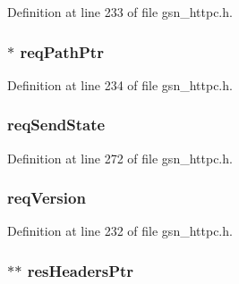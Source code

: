 Definition at line 233 of file gsn\_\-httpc.h.

\hypertarget{a00093_a89c93815bbc36a53553865e3a843157e}{
\subsubsection[{reqPathPtr}]{$\ast$ {\bf reqPathPtr}}}
\label{a00093_a89c93815bbc36a53553865e3a843157e}


Definition at line 234 of file gsn\_\-httpc.h.

\hypertarget{a00093_a2c234173930245803f6c71de3f819749}{
\subsubsection[{reqSendState}]{ {\bf reqSendState}}}
\label{a00093_a2c234173930245803f6c71de3f819749}


Definition at line 272 of file gsn\_\-httpc.h.

\hypertarget{a00093_abb6e9745613c073afeb3e2caa30ec30b}{
\subsubsection[{reqVersion}]{ {\bf reqVersion}}}
\label{a00093_abb6e9745613c073afeb3e2caa30ec30b}


Definition at line 232 of file gsn\_\-httpc.h.

\hypertarget{a00093_a78dccb1521490a4806f1802202cc4e7f}{
\subsubsection[{resHeadersPtr}]{$\ast$$\ast$ {\bf resHeadersPtr}}}
\label{a00093_a78dccb1521490a4806f1802202cc4e7f}


